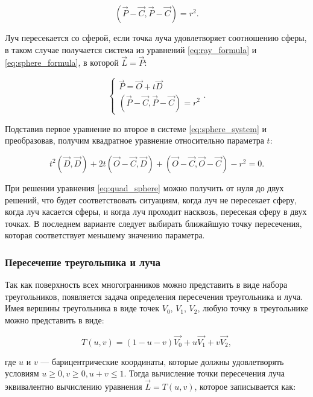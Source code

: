 \begin{equation}
	\label{eq:sphere_formula}
	( \vec{P} - \vec{C} , \vec{P} - \vec{C}) = r^2.
\end{equation}

Луч пересекается со сферой, если точка луча удовлетворяет соотношению сферы, в таком случае получается система из уравнений \ref{eq:ray_formula} и \ref{eq:sphere_formula}, в которой $\vec{L} = \vec{P}$:

\begin{equation}
	\label{eq:sphere_system}
	\begin{cases}
		\vec{P} = \vec{O} + t\vec{D} \\
		( \vec{P} - \vec{C} , \vec{P} - \vec{C}) = r^2
	\end{cases}.
\end{equation}

Подставив первое уравнение во второе в системе \ref{eq:sphere_system} и преобразовав, получим квадратное уравнение относительно параметра $t$:

\begin{equation}
	\label{eq:quad_sphere}
	t^2 (\vec{D} , \vec{D}) + 2t (\vec{O} - \vec{C} , \vec{D}) + (\vec{O} - \vec{C} , \vec{O} - \vec{C}) - r^2 = 0.
\end{equation}

При решении уравнения \ref{eq:quad_sphere} можно получить от нуля до двух решений, что будет соответствовать ситуациям, когда луч не пересекает сферу, когда луч касается сферы, и когда луч проходит насквозь, пересекая сферу в двух точках. В последнем варианте следует выбирать ближайшую точку пересечения, которая соответствует меньшему значению параметра.


\subsubsection{Пересечение треугольника и луча}

Так как поверхность всех многогранников можно представить в виде набора треугольников, появляется задача определения пересечения треугольника и луча. Имея вершины треугольника в виде точек $V_0$, $V_1$, $V_2$, любую точку в треугольнике можно представить в виде:

\begin{equation}
	T(u, v) = (1 - u - v)\vec{V_0} + u\vec{V_1} + v\vec{V_2},
\end{equation}

где $u$ и $v$ --- барицентрические координаты, которые должны удовлетворять условиям $u \geq 0, v \geq 0, u + v \leq 1$. Тогда вычисление точки пересечения луча эквивалентно вычислению уравнения $\vec{L} = T(u, v)$, которое записывается как:

